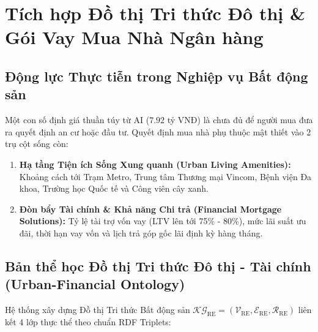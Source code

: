 \documentclass[12pt,a4paper]{report}
\begin{document}
\section{Tích hợp Đồ thị Tri thức Đô thị \& Gói Vay Mua Nhà Ngân hàng}

\subsection{Động lực Thực tiễn trong Nghiệp vụ Bất động sản}

Một con số định giá thuần túy từ AI ($7.92$ tỷ VNĐ) là chưa đủ để người mua đưa ra quyết định an cư hoặc đầu tư. Quyết định mua nhà phụ thuộc mật thiết vào 2 trụ cột sống còn:
\begin{enumerate}[leftmargin=1.5em]
    \item \textbf{Hạ tầng Tiện ích Sống Xung quanh (Urban Living Amenities):} Khoảng cách tới Trạm Metro, Trung tâm Thương mại Vincom, Bệnh viện Đa khoa, Trường học Quốc tế và Công viên cây xanh.
    \item \textbf{Đòn bẩy Tài chính \& Khả năng Chi trả (Financial Mortgage Solutions):} Tỷ lệ tài trợ vốn vay (LTV lên tới 75\% - 80\%), mức lãi suất ưu đãi, thời hạn vay vốn và lịch trả góp gốc lãi định kỳ hàng tháng.
\end{enumerate}

\subsection{Bản thể học Đồ thị Tri thức Đô thị - Tài chính (Urban-Financial Ontology)}

Hệ thống xây dựng Đồ thị Tri thức Bất động sản $\mathcal{KG}_{\text{RE}} = (\mathcal{V}_{\text{RE}}, \mathcal{E}_{\text{RE}}, \mathcal{R}_{\text{RE}})$ liên kết 4 lớp thực thể theo chuẩn RDF Triplets:
\end{document}
